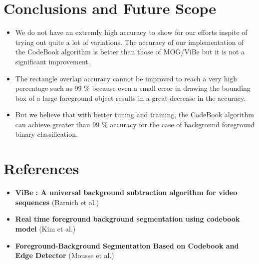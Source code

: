 \documentclass[12pt,a4paper]{article}
\begin{document}
\section{Conclusions and Future Scope}
\begin{itemize}
\item We do not have an extremly high accuracy to show for our efforts inspite of trying out quite a lot of variations. The accuracy of our implementation of the CodeBook algorithm is better than those of MOG/ViBe but it is not a significant improvement.
\item The rectangle overlap accuracy cannot be improved to reach a very high percentage such as 99 \% because even a small error in drawing the bounding box of a large foreground object results in a great decrease in the accuracy.
\item But we believe that with better tuning and training, the CodeBook algorithm can achieve greater than 99 \% accuracy for the case of background foreground binary classification.
\end{itemize}

\section{References}
\begin{itemize}
\item \textbf{ViBe : A universal background subtraction algorithm for video sequences} (Barnich et al.)
\item \textbf{Real time foreground background segmentation using codebook model} (Kim et al.)
\item \textbf{Foreground-Background Segmentation Based on Codebook and Edge Detector} (Mousse et al.)
\end{itemize}
\end{document}
